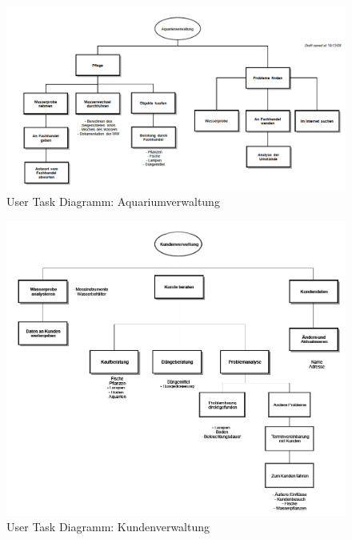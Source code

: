 \begin{figure}
	\centering
	\includegraphics[width=\linewidth,height=\textheight,
keepaspectratio]{utd_aqverwaltung}
	\caption{User Task Diagramm: Aquariumverwaltung}
	\label{utd_aqverwaltung}
\end{figure}

\begin{figure}
	\centering
	\includegraphics[width=\linewidth,height=\textheight,
keepaspectratio, angle=90]{utd_kuverwaltung}
	\caption{User Task Diagramm: Kundenverwaltung}
	\label{utd_kuverwaltung}
\end{figure}


